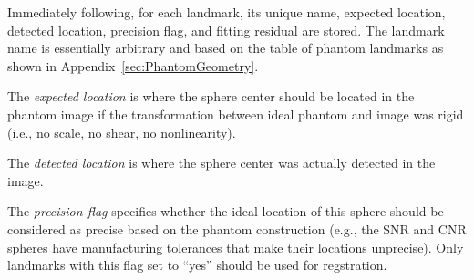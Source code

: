 \documentclass{InsightArticle}
\begin{document}
Immediately following, for each landmark, its unique name, expected location,
detected location, precision flag, and fitting residual are stored. The
landmark name is essentially arbitrary and based on the table of phantom
landmarks as shown in Appendix~\ref{sec:PhantomGeometry}.

The {\em expected location\/} is where the sphere center should be located in
the phantom image if the transformation between ideal phantom and image was
rigid (i.e., no scale, no shear, no nonlinearity). 

The {\em detected location\/} is where the sphere center was actually detected
in the image.

The {\em precision flag\/} specifies whether the ideal location of this sphere
should be considered as precise based on the phantom construction (e.g., the
SNR and CNR spheres have manufacturing tolerances that make their locations
unprecise). Only landmarks with this flag set to ``yes'' should be used for
regstration.
\end{document}
